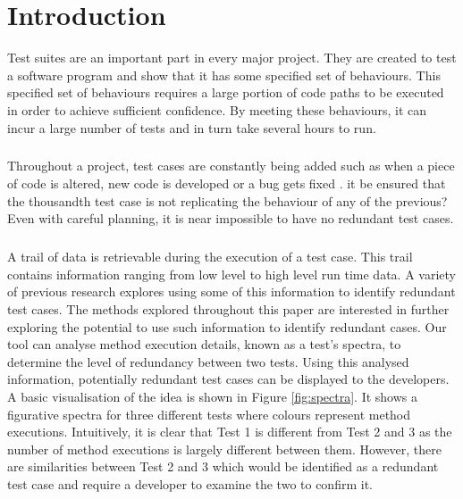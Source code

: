\chapter{Introduction}\label{C:intro}

Test suites are an important part in every major project. They are created to test a software program and show that it has some specified set of behaviours. This specified set of behaviours requires a large portion of code paths to be executed in order to achieve sufficient confidence. By meeting these behaviours, it can incur a large number of tests and in turn take several hours to run. 
\paragraph{}
Throughout a project, test cases are constantly being added such as when a piece of code is altered, new code is developed or a bug gets fixed \cite{issuetrack,whentotest}.  it be ensured that the thousandth test case is not replicating the behaviour of any of the previous? Even with careful planning, it is near impossible to have no redundant test cases. 
\paragraph{}
A trail of data is retrievable during the execution of a test case. This trail contains information ranging from low level to high level run time data. A variety of previous research \cite{wong1995effect, wong1999test, rothermel1998empirical, rothermel2002empirical,koochakzadeh2009test,zhang2011empirical,li2008static} explores using some of this information to identify redundant test cases. The methods explored throughout this paper are interested in further exploring the potential to use such information to identify redundant cases. Our tool can analyse method execution details, known as a test's spectra, to determine the level of redundancy between two tests. Using this analysed information, potentially redundant test cases can be displayed to the developers. A basic visualisation of the idea is shown in Figure \ref{fig:spectra}. It shows a figurative spectra for three different tests where colours represent method executions. Intuitively, it is clear that Test 1 is different from Test 2 and 3 as the number of method executions is largely different between them. However, there are similarities between Test 2 and 3 which would be identified as a redundant test case and require a developer to examine the two to confirm it. 

